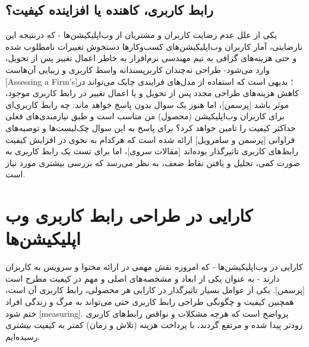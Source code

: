 \documentclass{report}
\theoremstyle{definition}
\begin{document}
\subsection{رابط کاربری، کاهنده یا افزاینده کیفیت؟}
یکی از علل عدم رضایت کاربران و مشتریان از وب‌اپلیکیشن‌ها - که درنتیجه این نارضایتی، آمار کاربران وب‌اپلیکیشن‌های کسب‌وکارها دستخوش تغییرات نامطلوب شده و حتی هزینه‌های گزافی به تیم مهندسی نرم‌افزار به خاطر اعمال تغییر پس از تحویل، وارد می‌شود- طراحی نه‌چندان کاربرپسندانه واسط کاربری و زیبایی آن‌هاست [Assessing a Firm's]؛ بدیهی است که استفاده از مدل‌های فرایندی چابک می‌تواند در کاهش هزینه‌های طراحی مجدد پس از تحویل و یا اعمال تغییر در رابط کاربری موجود، موثر باشد [پرسمن]، اما هنوز یک سوال بدون پاسخ خواهد ماند: چه رابط کاربری‌ای برای کاربران وب‌اپلیکیشن (محصول) من مناسب است و طبق نیازمندی‌های فعلی حداکثر کیفیت را تامین خواهد کرد؟ برای پاسخ به این سوال چک‌لیست‌ها و توصیه‌های فراوانی [پرسمن و سامرویل] ارائه شده است که هرکدام به نحوی در افزایش کیفیت رابط‌های کاربری تاثیرگذار بوده‌اند [مقالات سروی]، اما برای تست یک رابط کاربری به صورت کمی، تحلیل و یافتن نقاط ضعف، به نظر می‌رسد که بررسی بیشتری مورد نیاز است.
\section{کارایی در طراحی رابط کاربری وب اپلیکیشن‌ها}
کارایی در وب‌اپلیکیشن‌ها - که امروزه نقش مهمی در ارائه محتوا و سرویس به کاربران دارند - به عنوان یکی از ابعاد و مشخصه‌های اصلی و مهم در کیفیت مطرح است [پرسمن]. یکی از عوامل بسیار تاثیرگذار در کارایی هر محصولی، رابط کاربری آن است، همچنین کیفیت و چگونگی طراحی رابط کاربری حتی می‌تواند به مرگ و زندگی افراد ختم شود [measuring]. پرواضح است که هرچه مشکلات و نواقص رابط‌های کاربری زودتر پیدا شده و مرتفع گردند، با پرداخت هزینه (تلاش و زمان) کمتر به کیفیت بیشتری رسیده‌ایم.
\end{document}
